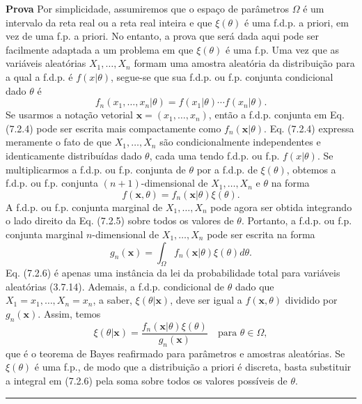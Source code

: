\vspace{1cm}
\noindent\textbf{Prova} \quad Por simplicidade, assumiremos que o espaço de parâmetros $\Omega$ é um intervalo da reta real ou a reta real inteira e que $\xi(\theta)$ é uma f.d.p. a priori, em vez de uma f.p. a priori. No entanto, a prova que será dada aqui pode ser facilmente adaptada a um problema em que $\xi(\theta)$ é uma f.p.
Uma vez que as variáveis aleatórias $X_1, \dots, X_n$ formam uma amostra aleatória da distribuição para a qual a f.d.p. é $f(x|\theta)$, segue-se que sua f.d.p. ou f.p. conjunta condicional dado $\theta$ é
\begin{equation}
f_n(x_1, \dots, x_n|\theta) = f(x_1|\theta)\cdots f(x_n|\theta). \tag{7.2.4}
\end{equation}
Se usarmos a notação vetorial $\mathbf{x}=(x_1, \dots, x_n)$, então a f.d.p. conjunta em Eq. (7.2.4) pode ser escrita mais compactamente como $f_n(\mathbf{x}|\theta)$. Eq. (7.2.4) expressa meramente o fato de que $X_1, \dots, X_n$ são condicionalmente independentes e identicamente distribuídas dado $\theta$, cada uma tendo f.d.p. ou f.p. $f(x|\theta)$.
Se multiplicarmos a f.d.p. ou f.p. conjunta de $\theta$ por a f.d.p. de $\xi(\theta)$, obtemos a f.d.p. ou f.p. conjunta $(n+1)$-dimensional de $X_1, \dots, X_n$ e $\theta$ na forma
\begin{equation}
f(\mathbf{x}, \theta) = f_n(\mathbf{x}|\theta)\xi(\theta). \tag{7.2.5}
\end{equation}
A f.d.p. ou f.p. conjunta marginal de $X_1, \dots, X_n$ pode agora ser obtida integrando o lado direito da Eq. (7.2.5) sobre todos os valores de $\theta$. Portanto, a f.d.p. ou f.p. conjunta marginal $n$-dimensional de $X_1, \dots, X_n$ pode ser escrita na forma
\begin{equation}
g_n(\mathbf{x}) = \int_{\Omega} f_n(\mathbf{x}|\theta)\xi(\theta)d\theta. \tag{7.2.6}
\end{equation}
Eq. (7.2.6) é apenas uma instância da lei da probabilidade total para variáveis aleatórias (3.7.14).
Ademais, a f.d.p. condicional de $\theta$ dado que $X_1=x_1, \dots, X_n=x_n$, a saber, $\xi(\theta|\mathbf{x})$, deve ser igual a $f(\mathbf{x}, \theta)$ dividido por $g_n(\mathbf{x})$. Assim, temos
\begin{equation}
\xi(\theta|\mathbf{x}) = \frac{f_n(\mathbf{x}|\theta)\xi(\theta)}{g_n(\mathbf{x})} \quad \text{para } \theta \in \Omega, \tag{7.2.7}
\end{equation}
que é o teorema de Bayes reafirmado para parâmetros e amostras aleatórias. Se $\xi(\theta)$ é uma f.p., de modo que a distribuição a priori é discreta, basta substituir a integral em (7.2.6) pela soma sobre todos os valores possíveis de $\theta$. \rule{0.5em}{0.5em}

